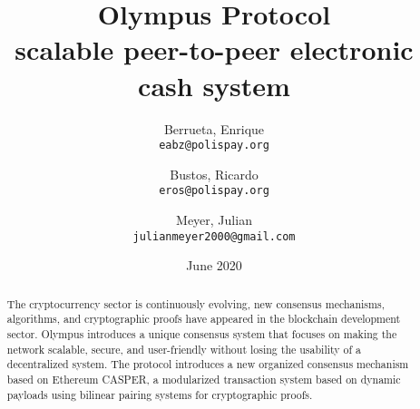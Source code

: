 \documentclass{article}
\title{%
  Olympus Protocol \\
  \A scalable peer-to-peer electronic cash system}
\author{
  Berrueta, Enrique\\
  \texttt{eabz@polispay.org}
  \and
  Bustos, Ricardo\\
  \texttt{eros@polispay.org}
  \and
  Meyer, Julian\\
  \texttt{julianmeyer2000@gmail.com}
}
\date{June 2020}
\begin{document}
	\maketitle
	\begin{abstract}
		The cryptocurrency sector is continuously evolving, new consensus mechanisms, algorithms, and cryptographic proofs have appeared in the blockchain development sector. Olympus introduces a unique consensus system that focuses on making the network scalable, secure, and user-friendly without losing the usability of a decentralized system. The protocol introduces a new organized consensus mechanism based on Ethereum CASPER, a modularized transaction system based on dynamic payloads using bilinear pairing systems for cryptographic proofs.
	\end{abstract}
	
	\newpage
	\tableofcontents		
	
\end{document}
